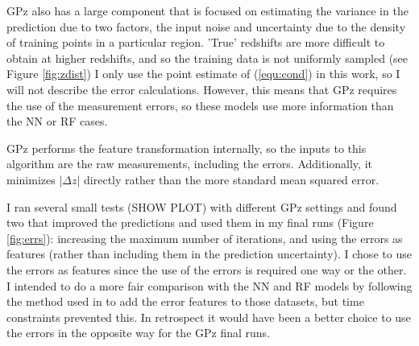 \documentclass[13pt]{amsart}
\newcommand{\equin}[1]{\(#1\)}
\begin{document}
      GPz also has a large component that is focused on estimating the variance in the prediction due to two factors, the input noise and uncertainty due to the density of training points in a particular region. 'True' redshifts are more difficult to obtain at higher redshifts, and so the training data is not uniformly sampled (see Figure \ref{fig:zdist}) I only use the point estimate of (\ref{equ:cond}) in this work, so I will not describe the error calculations. However, this means that GPz requires the use of the measurement errors, so these models use more information than the NN or RF cases.

      GPz performs the feature transformation internally, so the inputs to this algorithm are the raw measurements, including the errors. Additionally, it minimizes
      \equin{| \Delta z |} directly rather than the more standard mean squared error.


      I ran several small tests (SHOW PLOT) with different GPz settings and found two that improved the predictions and used them in my final runs (Figure \ref{fig:errs}): increasing the maximum number of iterations, and using the errors as features (rather than including them in the prediction uncertainty). I chose to use the errors as features since the use of the errors is required one way or the other. I intended to do a more fair comparison with the NN and RF models by following the method used in \cite{graham} to add the error features to those datasets, but time constraints prevented this. In retrospect it would have been a better choice to use the errors in the opposite way for the GPz final runs.
\end{document}
